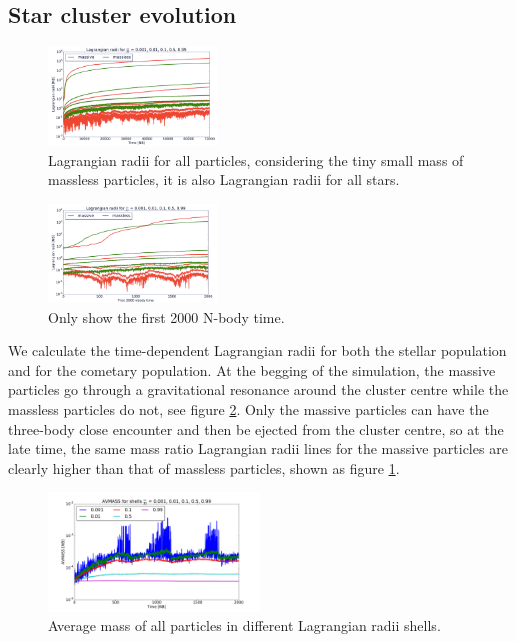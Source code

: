 \documentclass[usenatbib]{mn2e}
\newcommand{\nna}{N_{\rm 1}}
\newcommand{\nnc}{N_{\rm 3}}
\begin{document}
\subsection{Star cluster evolution}

\begin{figure}
  \centering
  \includegraphics[width=0.4\textwidth,height=!]{lagrComparing.pdf}
  \caption{Lagrangian radii for all particles, considering the tiny small mass of massless particles, it is also Lagrangian radii for all stars.}
  \label{fig:lagrComparing}
\end{figure}


\begin{figure}
  \centering
  \includegraphics[width=0.4\textwidth,height=!]{lagr2000st.pdf}
  \caption{Only show the first 2000 N-body time.}
  \label{fig:lagr2000st}
\end{figure}

We calculate the time-dependent Lagrangian radii for both the stellar population and for the cometary population. At the begging of the simulation, the massive particles go through a gravitational resonance around the cluster centre while the massless particles do not, see figure \ref{fig:lagr2000st}.  Only the massive particles can have the three-body close encounter and then be ejected from the cluster centre, so at the late time, the same mass ratio Lagrangian radii lines for the massive particles are clearly higher than that of massless particles, shown as figure \ref{fig:lagrComparing}. 

\begin{figure}
  \centering
  \includegraphics[width=0.5\textwidth,height=!]{avmass.pdf}
  \caption{Average mass of all particles in different Lagrangian radii shells.}
  \label{fig:avmass}
\end{figure}
\end{document}
